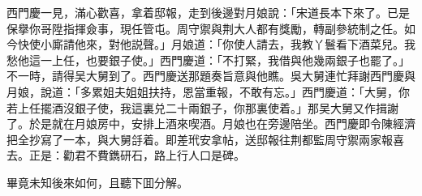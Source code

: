 西門慶一見，滿心歡喜，拿着邸報，走到後邊對月娘說：「宋道長本下來了。已是保擧你哥陞指揮僉事，現任管屯。周守禦與荆大人都有獎勵，轉副參統制之任。如今快使小廝請他來，對他説聲。」月娘道：「你使人請去，我教丫鬟看下酒菜兒。我愁他這一上任，也要銀子使。」西門慶道：「不打緊，我借與他幾兩銀子也罷了。」不一時，請得吴大舅到了。西門慶送那題奏旨意與他瞧。吳大舅連忙拜謝西門慶與月娘，說道：「多累姐夫姐姐扶持，恩當重報，不敢有忘。」西門慶道：「大舅，你若上任擺酒沒銀子使，我這裏兑二十兩銀子，你那裏使着。」那吴大舅又作揖謝了。於是就在月娘房中，安排上酒來喫酒。月娘也在旁邊陪坐。西門慶即令陳經濟把全抄寫了一本，與大舅㧱着。即差玳安拿帖，送邸報往荆都監周守禦兩家報喜去。正是：勸君不費鐫研石，路上行人口是碑。

畢竟未知後來如何，且聽下囬分解。

